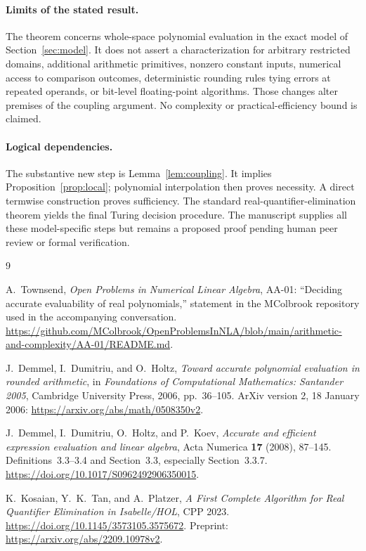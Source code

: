 \documentclass[11pt,a4paper]{article}
\numberwithin{equation}{section}
\theoremstyle{definition}
\theoremstyle{remark}
\begin{document}
\paragraph{Limits of the stated result.}
The theorem concerns whole-space polynomial evaluation in the exact model
of Section~\ref{sec:model}.  It does not assert a characterization for
arbitrary restricted domains, additional arithmetic primitives, nonzero
constant inputs, numerical access to comparison outcomes, deterministic
rounding rules tying errors at repeated operands, or bit-level
floating-point algorithms.  Those changes alter premises of the coupling
argument.  No complexity or practical-efficiency bound is claimed.

\paragraph{Logical dependencies.}
The substantive new step is Lemma~\ref{lem:coupling}.  It implies
Proposition~\ref{prop:local}; polynomial interpolation then proves
necessity.  A direct termwise construction proves sufficiency.  The
standard real-quantifier-elimination theorem yields the final Turing
decision procedure.  The manuscript supplies all these model-specific
steps but remains a proposed proof pending human peer review or formal
verification.

\begin{thebibliography}{9}

A.~Townsend,
\emph{Open Problems in Numerical Linear Algebra},
AA-01: ``Deciding accurate evaluability of real polynomials,''
statement in the MColbrook repository used in the accompanying
conversation.
\url{https://github.com/MColbrook/OpenProblemsInNLA/blob/main/arithmetic-and-complexity/AA-01/README.md}.

J.~Demmel, I.~Dumitriu, and O.~Holtz,
\emph{Toward accurate polynomial evaluation in rounded arithmetic},
in \emph{Foundations of Computational Mathematics: Santander 2005},
Cambridge University Press, 2006, pp.~36--105.
ArXiv version 2, 18 January 2006:
\url{https://arxiv.org/abs/math/0508350v2}.

J.~Demmel, I.~Dumitriu, O.~Holtz, and P.~Koev,
\emph{Accurate and efficient expression evaluation and linear algebra},
Acta Numerica \textbf{17} (2008), 87--145.
Definitions~3.3--3.4 and Section~3.3, especially Section~3.3.7.
\url{https://doi.org/10.1017/S0962492906350015}.

K.~Kosaian, Y.~K.~Tan, and A.~Platzer,
\emph{A First Complete Algorithm for Real Quantifier Elimination in
Isabelle/HOL},
CPP 2023.
\url{https://doi.org/10.1145/3573105.3575672}.
Preprint:
\url{https://arxiv.org/abs/2209.10978v2}.

\end{thebibliography}
\end{document}
